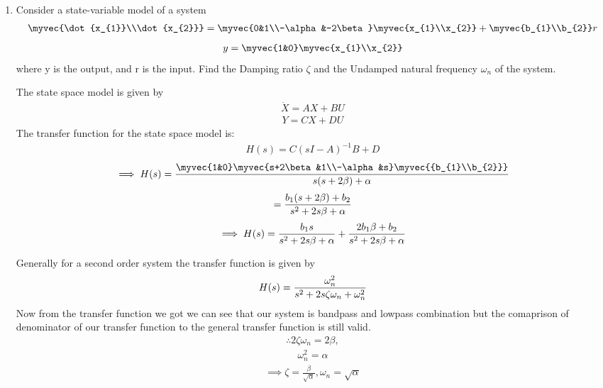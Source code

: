 \begin{enumerate}[label=\thesection.\arabic*.,ref=\thesection.\theenumi]

\item Consider a state-variable model of a system 
\begin{align}
\myvec{\dot{x_{1}}\\\dot{x_{2}}}
=
\myvec{0&1\\-\alpha&-2\beta}\myvec{x_{1}\\x_{2}}
+
\myvec{b_{1}\\b_{2}}  r
\end{align}
\begin{align}
y
=
\myvec{1&0}\myvec{x_{1}\\x_{2}}
\end{align}
where y is the output, and r is the input.
%
Find the Damping ratio $\zeta$ and the Undamped natural frequency $\omega_{n}$ of the system.

\solution The state space model is given by
\begin{align}
\dot{X} = AX + BU
\end{align}
\begin{align}
Y = CX + DU
\end{align}
%
The transfer function for the state space model is:
\begin{align}
H(s) = C(sI - A)^{-1}B + D
\end{align}
\begin{align}
\implies H(s) = \frac{\myvec{1&0}\myvec{s+2\beta&1\\-\alpha&s}\myvec{{b_{1}\\b_{2}}}}{s(s+2\beta) + \alpha}
\end{align}
\begin{align}
= \LARGE{\frac{b_{1}(s+2\beta) + b_{2}}{s^{2}+2s\beta+\alpha}}
\end{align}
\begin{align}
   \implies H(s) = \LARGE{\frac{b_{1}s}{s^{2}+2s\beta+\alpha}} + \LARGE{\frac{2b_{1}\beta + b_{2}}{s^{2}+2s\beta+\alpha}}
\end{align}
\begin{table}[!ht]
\centering

\caption{}
\label{table:EE18btech11011}
\end{table}
Generally for a second order system the transfer function is given by
\begin{align}
H(s) = \LARGE{\frac{\omega_{n}^2}{s^{2}+2s\zeta\omega_{n}+\omega_{n}^2}}
\end{align}
Now from the transfer function we got we can see that our system is bandpass and lowpass combination but the comaprison of denominator of our transfer function to the general transfer function is still valid.
\begin{align}
\therefore 2\zeta\omega_{n} = 2\beta,
\end{align}
\begin{align}
\omega_{n}^2 = \alpha
\end{align}
\begin{align}
\implies \zeta = \frac{\beta}{\sqrt{\alpha}} , \omega_{n} = \sqrt{\alpha}
\end{align}
\end{enumerate}

